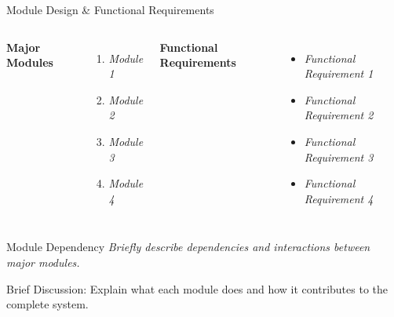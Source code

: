 \documentclass[aspectratio=169,11pt]{beamer}
\newcommand{\smallnote}[1]{%
\vspace{0.08cm}
{\scriptsize\color{GEUGrey}#1}
}
\newcommand{\placeholder}[1]{%
\textit{\color{GEUGrey}#1}
}
\begin{document}
\begin{frame}{Module Design \& Functional Requirements}

\begin{columns}[T,totalwidth=\textwidth]


\textbf{\color{GEUBlue}Major Modules}

\begin{enumerate}\itemsep3pt
\item \placeholder{Module 1}
\item \placeholder{Module 2}
\item \placeholder{Module 3}
\item \placeholder{Module 4}
\end{enumerate}


\textbf{\color{GEUBlue}Functional Requirements}

\begin{itemize}\itemsep3pt
\item \placeholder{Functional Requirement 1}
\item \placeholder{Functional Requirement 2}
\item \placeholder{Functional Requirement 3}
\item \placeholder{Functional Requirement 4}
\end{itemize}

\end{columns}

\vfill

\begin{block}{Module Dependency}
\placeholder{
Briefly describe dependencies and interactions between major modules.
}
\end{block}

\smallnote{
Brief Discussion: Explain what each module does and how it contributes
to the complete system.
}

\end{frame}
\end{document}
